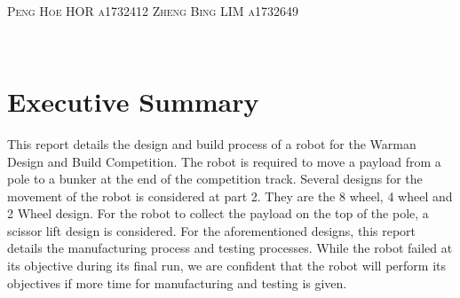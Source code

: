 \documentclass[12pt]{report}
\begin{document}
\begin{titlepage}
\begin{minipage}{0.5\textwidth}
\begin{flushleft}
\end{flushleft}
\end{minipage}
~
\begin{minipage}{0.4\textwidth}
\begin{flushright} \small
  \textsc{Peng Hoe HOR}
   \linebreak
 \textsc{a1732412}
 \linebreak
  \linebreak
  \textsc{Zheng Bing LIM}
   \linebreak
 \textsc{a1732649}
 \linebreak
 \linebreak
  \linebreak
\end{flushright}
\end{minipage}\\[0.5cm]
\end{titlepage}

\section*{Executive Summary}
This report details the design and build process of a robot for the Warman Design and Build Competition. The robot is required to move a payload from a pole to a bunker at the end of the competition track. Several designs for the movement of the robot is considered at part 2. They are the 8 wheel, 4 wheel and 2 Wheel design. For the robot to collect the payload on the top of the pole, a scissor lift design is considered. For the aforementioned designs, this report details the manufacturing process and testing processes. While the robot failed at its objective during its final run, we are confident that the robot will perform its objectives if more time for manufacturing and testing is given.
\setcounter{page}{2} %
\pagebreak

\end{document}
